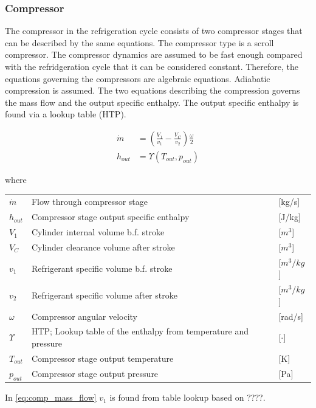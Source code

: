 \subsubsection{Compressor}
The compressor in the refrigeration cycle consists of two compressor stages that can be described by the same equations. The compressor type is a scroll compressor.
The compressor dynamics are assumed to be fast enough compared with the refridgeration cycle that it can be considered constant. Therefore, the equations governing the compressors are algebraic equations.
Adiabatic compression is assumed.
The two equations describing the compression governs the mass flow and the output specific enthalpy. The output specific enthalpy is found via a lookup table (HTP).

\begin{align}
	\dot{m} &= \left(\frac{V_1}{v_1} - \frac{V_C}{v_2}\right) \frac{\omega}{2} \\ \label{eq:comp_mass_flow}
	h_{out} &= \Upsilon(T_{out}, p_{out})
\end{align}

where

\begin{center}
	\begin{tabular}{l p{8cm} l}
		$\dot{m}$				& Flow through compressor stage					& [\si{kg}/\si{s}] \\
		$h_{out}$				& Compressor stage output specific enthalpy				& [\si{J}/\si{kg}] \\
		$V_1$					& Cylinder internal volume b.f. stroke			& [$\si{m}^3$] \\
		$V_C$					& Cylinder clearance volume after stroke		& [$\si{m}^3$] \\
		$v_1$					& Refrigerant specific volume b.f. stroke		& [$\si{m}^3/\si{kg}$] \\
		$v_2$					& Refrigerant specific volume after stroke		& [$\si{m}^3/\si{kg}$] \\
		$\omega$ 				& Compressor angular velocity 					& [\si{rad}/\si{s}]\\
		$\Upsilon$ 				& HTP; Lookup table of the enthalpy from temperature and pressure 			& [$\cdot]$ \\
		$T_{out}$ 				& Compressor stage output temperature 			& [\si{K}] \\
		$p_{out}$				& Compressor stage output pressure 				& [\si{Pa}]
	\end{tabular}
\end{center}

In \cref{eq:comp_mass_flow} $v_1$ is found from table lookup based on ????.

